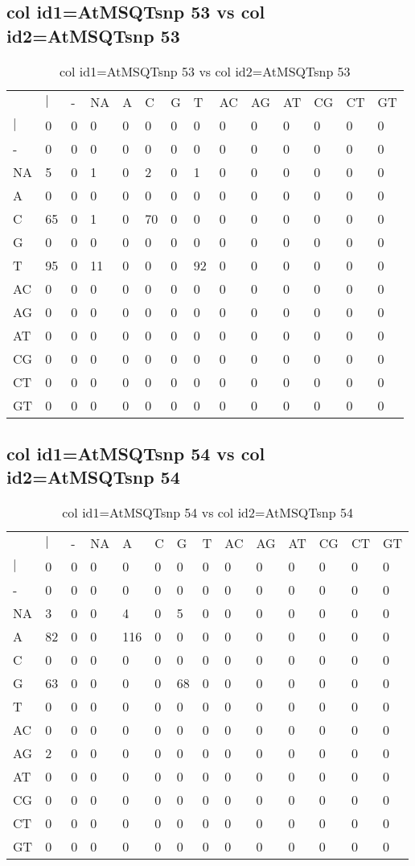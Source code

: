 \subsection{col id1=AtMSQTsnp 53 vs col id2=AtMSQTsnp 53}
\begin{center}
\begin{longtable}{|l|l|l|l|l|l|l|l|l|l|l|l|l|l|}
\caption{col id1=AtMSQTsnp 53 vs col id2=AtMSQTsnp 53} \label{table_dm942}\\
\hline
\\
\hline
&$|$&-&NA&A&C&G&T&AC&AG&AT&CG&CT&GT\\
$|$&0&0&0&0&0&0&0&0&0&0&0&0&0\\
-&0&0&0&0&0&0&0&0&0&0&0&0&0\\
NA&5&0&1&0&2&0&1&0&0&0&0&0&0\\
A&0&0&0&0&0&0&0&0&0&0&0&0&0\\
C&65&0&1&0&70&0&0&0&0&0&0&0&0\\
G&0&0&0&0&0&0&0&0&0&0&0&0&0\\
T&95&0&11&0&0&0&92&0&0&0&0&0&0\\
AC&0&0&0&0&0&0&0&0&0&0&0&0&0\\
AG&0&0&0&0&0&0&0&0&0&0&0&0&0\\
AT&0&0&0&0&0&0&0&0&0&0&0&0&0\\
CG&0&0&0&0&0&0&0&0&0&0&0&0&0\\
CT&0&0&0&0&0&0&0&0&0&0&0&0&0\\
GT&0&0&0&0&0&0&0&0&0&0&0&0&0\\
\hline
\end{longtable}
\end{center}

\subsection{col id1=AtMSQTsnp 54 vs col id2=AtMSQTsnp 54}
\begin{center}
\begin{longtable}{|l|l|l|l|l|l|l|l|l|l|l|l|l|l|}
\caption{col id1=AtMSQTsnp 54 vs col id2=AtMSQTsnp 54} \label{table_dm944}\\
\hline
\\
\hline
&$|$&-&NA&A&C&G&T&AC&AG&AT&CG&CT&GT\\
$|$&0&0&0&0&0&0&0&0&0&0&0&0&0\\
-&0&0&0&0&0&0&0&0&0&0&0&0&0\\
NA&3&0&0&4&0&5&0&0&0&0&0&0&0\\
A&82&0&0&116&0&0&0&0&0&0&0&0&0\\
C&0&0&0&0&0&0&0&0&0&0&0&0&0\\
G&63&0&0&0&0&68&0&0&0&0&0&0&0\\
T&0&0&0&0&0&0&0&0&0&0&0&0&0\\
AC&0&0&0&0&0&0&0&0&0&0&0&0&0\\
AG&2&0&0&0&0&0&0&0&0&0&0&0&0\\
AT&0&0&0&0&0&0&0&0&0&0&0&0&0\\
CG&0&0&0&0&0&0&0&0&0&0&0&0&0\\
CT&0&0&0&0&0&0&0&0&0&0&0&0&0\\
GT&0&0&0&0&0&0&0&0&0&0&0&0&0\\
\hline
\end{longtable}
\end{center}

